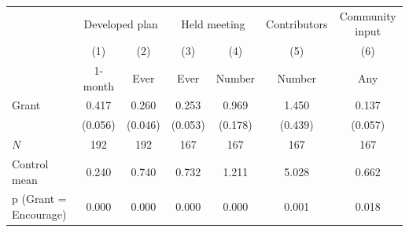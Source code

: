 \begin{tabular*}{\hsize}{@{\hskip\tabcolsep\extracolsep\fill}l*{6}{c}}
\toprule
            &\multicolumn{2}{c}{Developed plan}&\multicolumn{2}{c}{Held meeting}&\multicolumn{1}{c}{Contributors}&\multicolumn{1}{c}{Community input}\\\cmidrule(lr){2-3}\cmidrule(lr){4-5}\cmidrule(lr){6-6}\cmidrule(lr){7-7}
            &\multicolumn{1}{c}{(1)}&\multicolumn{1}{c}{(2)}&\multicolumn{1}{c}{(3)}&\multicolumn{1}{c}{(4)}&\multicolumn{1}{c}{(5)}&\multicolumn{1}{c}{(6)}\\
            &\multicolumn{1}{c}{1-month}&\multicolumn{1}{c}{Ever}&\multicolumn{1}{c}{Ever}&\multicolumn{1}{c}{Number}&\multicolumn{1}{c}{Number}&\multicolumn{1}{c}{Any}\\
\midrule
Grant       &       0.417&       0.260&       0.253&       0.969&       1.450&       0.137\\
            &     (0.056)&     (0.046)&     (0.053)&     (0.178)&     (0.439)&     (0.057)\\
\midrule
\(N\)       &         192&         192&         167&         167&         167&         167\\
Control mean&       0.240&       0.740&       0.732&       1.211&       5.028&       0.662\\
p (Grant = Encourage)&       0.000&       0.000&       0.000&       0.000&       0.001&       0.018\\
\bottomrule
\end{tabular*}
